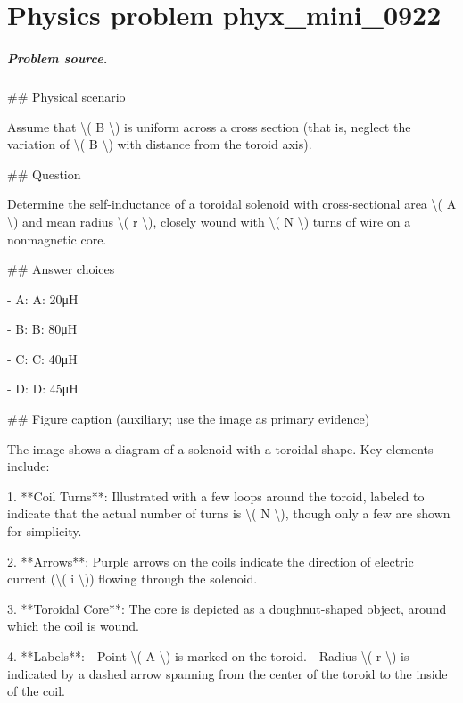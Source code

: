 
\chapter{Physics problem phyx\_mini\_0922}
\label{ch:PhyXMiniProblems_problem_phyx_mini_0922}

\paragraph{Problem source.}
\#\# Physical scenario

Assume that \textbackslash{}( B \textbackslash{}) is uniform across a cross section (that is, neglect the variation of \textbackslash{}( B \textbackslash{}) with distance from the toroid axis).

\#\# Question

Determine the self-inductance of a toroidal solenoid with cross-sectional area \textbackslash{}( A \textbackslash{}) and mean radius \textbackslash{}( r \textbackslash{}), closely wound with \textbackslash{}( N \textbackslash{}) turns of wire on a nonmagnetic core.

\#\# Answer choices

- A: A: 20μH

- B: B: 80μH

- C: C: 40μH

- D: D: 45μH

\#\# Figure caption (auxiliary; use the image as primary evidence)

The image shows a diagram of a solenoid with a toroidal shape. Key elements include:

1. **Coil Turns**: Illustrated with a few loops around the toroid, labeled to indicate that the actual number of turns is \textbackslash{}( N \textbackslash{}), though only a few are shown for simplicity.

2. **Arrows**: Purple arrows on the coils indicate the direction of electric current (\textbackslash{}( i \textbackslash{})) flowing through the solenoid.

3. **Toroidal Core**: The core is depicted as a doughnut-shaped object, around which the coil is wound.

4. **Labels**:
   - Point \textbackslash{}( A \textbackslash{}) is marked on the toroid.
   - Radius \textbackslash{}( r \textbackslash{}) is indicated by a dashed arrow spanning from the center of the toroid to the inside of the coil.

